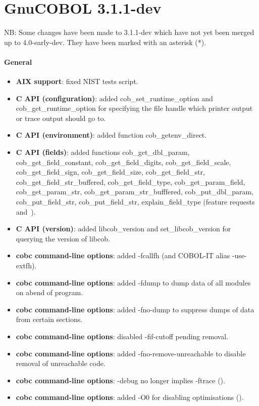 \section{GnuCOBOL 3.1.1-dev}

NB: Some changes have been made to 3.1.1-dev which have not yet been merged up to 4.0-early-dev. They have been marked with an asterisk (*).

\paragraph{General}
\begin{itemize}
\item \textbf{AIX support}: fixed NIST tests script.
\item \textbf{C API (configuration)}: added cob\_set\_runtime\_option and cob\_get\_runtime\_option for specifying the file handle which printer output or trace output should go to.
\item \textbf{C API (environment)}: added function cob\_getenv\_direct.
\item \textbf{C API (fields)}: added functions cob\_get\_dbl\_param, cob\_get\_field\_constant, cob\_get\_field\_digits, cob\_get\_field\_scale, cob\_get\_field\_sign, cob\_get\_field\_size, cob\_get\_field\_str, cob\_get\_field\_str\_buffered, cob\_get\_field\_type, cob\_get\_param\_field, cob\_get\_param\_str, cob\_get\_param\_str\_bufffered, cob\_put\_dbl\_param, cob\_put\_field\_str, cob\_put\_field\_str, explain\_field\_type (feature requests  and~).
\item \textbf{C API (version)}: added libcob\_version and set\_libcob\_version for querying the version of libcob.
\item \textbf{cobc command-line options}: added -fcallfh (and COBOL-IT alias -use-extfh).
\item \textbf{cobc command-line options}: added -fdump to dump data of all modules on abend of program.
\item \textbf{cobc command-line options}: added -fno-dump to suppress dumps of data from certain sections.
\item \textbf{cobc command-line options}: disabled -fif-cutoff pending removal.
\item \textbf{cobc command-line options}: added -fno-remove-unreachable to disable removal of unreachable code.
\item \textbf{cobc command-line options}: -debug no longer implies -ftrace ().
\item \textbf{cobc command-line options}: added -O0 for disabling optimisations ().

\end{itemize}
